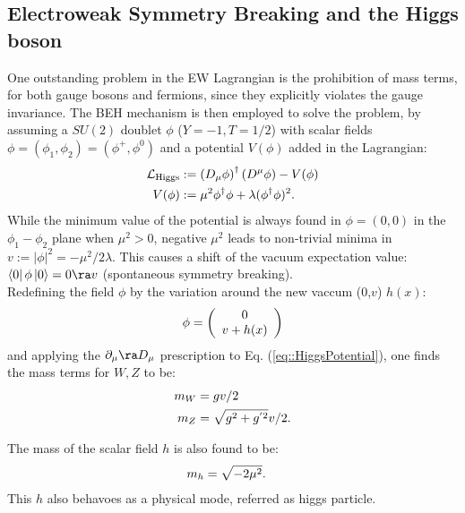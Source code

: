 \subsection{Electroweak Symmetry Breaking and the Higgs boson}
One outstanding problem in the EW Lagrangian is the prohibition of mass terms, for both gauge bosons and fermions, since they explicitly violates the gauge invariance. 
The BEH mechanism \cite{SSBBroutEnglert,SSBHiggs} is then employed to solve the problem, by assuming a $SU(2)$ doublet $\phi$ ($Y=-1, T=1/2$) with scalar fields $\phi=(\phi_1,\phi_2)=(\phi^+,\phi^0)$ and a potential $V(\phi)$ added in the Lagrangian:
\begin{align}
\mathcal{L}_{\mathrm{Higgs}} & := \left(D_\mu \phi \right)^\dagger \left(D^\mu \phi \right) - V(\phi) \nonumber \\
                     V(\phi) & := \mu^2 \phi^\dagger \phi + \lambda (\phi^\dagger \phi)^2.
\label{eq::HiggsPotential}
\end{align}
While the minimum value of the potential is always found in $\phi=(0,0)$ in the $\phi_1-\phi_2$ plane when $\mu^2>0$, 
negative $\mu^2$ leads to non-trivial minima in $v := |\phi|^2 = -\mu^2/2\lambda$. 
This causes a shift of the vacuum expectation value: $\bra{0} \phi \ket{0} = 0 \ra v$ (spontaneous symmetry breaking). \\

Redefining the field $\phi$ by the variation around the new vaccum (0,$v$) $h(x)$:
\begin{align}
\phi = \left( \begin{array}{c} 0 \\ v+h(x) \end{array} \right)
\label{eq::SSB}
\end{align}
and applying the $\partial_\mu \ra D_\mu$ prescription to Eq. (\ref{eq::HiggsPotential}),
one finds the mass terms for $W,Z$ to be:
\begin{align}
m_W & = gv/2 \nonumber \\
m_Z & = \sqrt{g^2+g^{' 2}} v/2. \nonumber
\end{align}

The mass of the scalar field $h$ is also found to be:
\begin{align}
m_h & = \sqrt{-2\mu^2}.  \nonumber
\end{align}
This $h$ also behavoes as a physical mode, referred as higgs particle. \\


